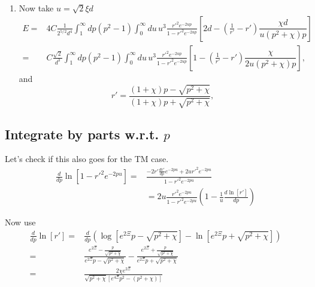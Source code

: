 \begin{enumerate}
\item Now take $u = \sqrt{2}\xi d$ 
 \begin{align}
E=&  4C\frac{1}{2^{5/2}d^4}\int_1^\infty dp (p^2-1)\int_0^\infty du\,u^{3} \frac{r'^2e^{-2u p}}{1-r'^2e^{-2u p}}\left[2d- \left(\frac{1}{r'}-r'\right)\dfrac{\chi d}{u(p^2+\chi)p}\right]\\
=&  C\frac{\sqrt{2}}{d^3}\int_1^\infty dp (p^2-1)\int_0^\infty du\,u^{3}  \frac{r'^2e^{-2u p}}{1-r'^2e^{-2u p}}\left[1- \left(\frac{1}{r'}-r'\right)\dfrac{\chi }{2u(p^2+\chi)p}\right],
\end{align}
and 
\begin{equation}
r' =  \frac{(1+\chi)p-\sqrt{p^2 + \chi}}{(1+ \chi)p+\sqrt{p^2+\chi}},
\end{equation}
\end{enumerate}

\subsection{Integrate by parts w.r.t. $p$}
Let's check if this also goes for the TM case.  
\begin{align}
\frac{d}{dp}\ln[1-r'^2 e^{-2pu}] =& \frac{-2r' \frac{dr'}{dp} e^{-2pu} + 2u r'^2 e^{-2pu}}{1-r'^2 e^{-2pu}} \\
&= 2u\frac{r'^2 e^{-2pu}}{1-r'^2 e^{-2pu}}\left( 1 -\frac{1}{u} \frac{d\ln[r']}{dp}\right)
\end{align}

Now use 
\begin{align}
\frac{d}{dp}\ln[r'] =& \frac{d}{dp}\left(\log[e^{2\Xi}p - \sqrt{p^2+\chi}] -\ln[e^{2\Xi}p + \sqrt{p^2+\chi}]\right) \\
=& \frac{e^{2\Xi} - \frac{p}{\sqrt{p^2+\chi}}}{e^{2\Xi}p-\sqrt{p^2+\chi}} -\frac{e^{2\Xi} + \frac{p}{\sqrt{p^2+\chi}}}{e^{2\Xi}p + \sqrt{p^2+\chi}}\\ 
=& \frac{2\chi e^{2\Xi}}{\sqrt{p^2+\chi}[e^{4\Xi}p^2-(p^2+\chi)]}\label{eq:TM_integration_by_parts}
\end{align}

